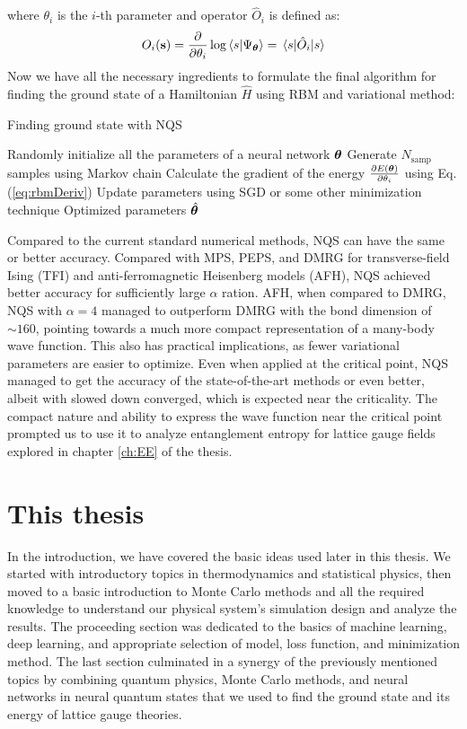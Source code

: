 where $\theta_i$ is the $i$-th parameter and operator $\hat{O}_i$ is defined as:
\begin{equation}
	O_i(\vb{s}) = \pdv{\theta_i}\log \braket{s}{\Psi_{\vbtheta}} = \ev{\hat{O}_i}{s}
\end{equation}
Now we have all the necessary ingredients to formulate the final algorithm for finding the ground state of a Hamiltonian $\hat{H}$ using RBM and variational method:
\begin{algorithm}
	\caption{Finding ground state with NQS}
	\begin{algorithmic}
		\State Randomly initialize all the parameters of a neural network $\boldsymbol{\theta}$
		\State Generate $N_{\text{samp}}$ samples using Markov chain
		\State Calculate the gradient of the energy $\pdv{E(\boldsymbol{\theta})}{\theta_i}$ using Eq.(\ref{eq:rbmDeriv})
		\State Update parameters using SGD or some other minimization technique
		\EndFor
		\State \Return Optimized parameters $\hat{\boldsymbol{\theta}}$
	\end{algorithmic}
\end{algorithm}
\par
Compared to the current standard numerical methods, NQS can have the same or better accuracy\cite{carleoTroyer}. Compared with MPS, PEPS, and DMRG for transverse-field Ising (TFI) and anti-ferromagnetic Heisenberg models (AFH), NQS achieved better accuracy for sufficiently large $\alpha$ ration. AFH, when compared to DMRG, NQS with $\alpha=4$ managed to outperform DMRG with the bond dimension of $\sim 160$, pointing towards a much more compact representation of a many-body wave function. This also has practical implications, as fewer variational parameters are easier to optimize. Even when applied at the critical point, NQS managed to get the accuracy of the state-of-the-art methods or even better, albeit with slowed down converged, which is expected near the criticality. The compact nature and ability to express the wave function near the critical point prompted us to use it to analyze entanglement entropy for lattice gauge fields explored in chapter \ref{ch:EE} of the thesis. 
\newpage

\section{This thesis}
In the introduction, we have covered the basic ideas used later in this thesis. We started with introductory topics in thermodynamics and statistical physics, then moved to a basic introduction to Monte Carlo methods and all the required knowledge to understand our physical system's simulation design and analyze the results. The proceeding section was dedicated to the basics of machine learning, deep learning, and appropriate selection of model, loss function, and minimization method. The last section culminated in a synergy of the previously mentioned topics by combining quantum physics, Monte Carlo methods, and neural networks in neural quantum states that we used to find the ground state and its energy of lattice gauge theories.

